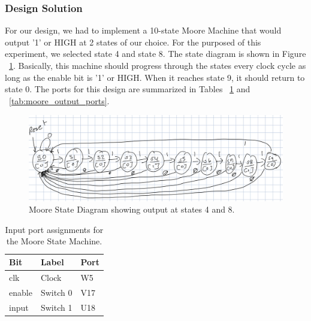 \documentclass[11pt]{article}
\begin{document}
\subsubsection{Design Solution}
For our design, we had to implement a 10-state Moore Machine that would output '1' or HIGH at 2 states of our choice. For the purposed of this experiment, we selected state 4 and state 8. The state diagram is shown in Figure ~\ref{fig:moore_state_diagram}. Basically, this machine should progress through the states every clock cycle as long as the enable bit is '1' or HIGH. When it reaches state 9, it should return to state 0. The ports for this design are summarized in Tables ~\ref{tab:moore_input_ports} and ~\ref{tab:moore_output_ports}.

\begin{center}
\begin{figure}[H]
	\includegraphics[width=\textwidth]{images/img1.jpg}
	\caption{\label{fig:moore_state_diagram}Moore State Diagram showing output at states 4 and 8.}
\end{figure}
\end{center}

\begin{table}[H]
\begin{center}
\begin{tabular}{| l | l | l |}
	\hline
	Bit & Label & Port \\ \hline
	clk & Clock & W5 \\ \hline
	enable & Switch 0 & V17 \\ \hline
	input & Switch 1 & U18 \\ \hline
\end{tabular}
\caption{\label{tab:moore_input_ports}Input port assignments for the Moore State Machine.}
\end{center}
\end{table}
\end{document}
